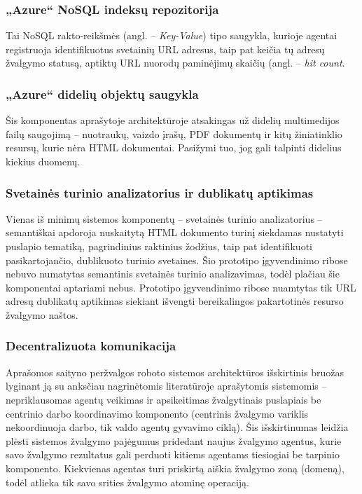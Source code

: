 \subsubsection{„Azure“ NoSQL indeksų repozitorija}

Tai NoSQL rakto-reikšmės (angl. -- \textit{Key-Value}) tipo saugykla, kurioje agentai registruoja identifikuotus svetainių URL adresus, taip pat keičia tų adresų žvalgymo statusą, aptiktų URL nuorodų paminėjimų skaičių (angl. -- \textit{hit count}.

\subsubsection{„Azure“ didelių objektų saugykla}

Šis komponentas aprašytoje architektūroje atsakingas už didelių multimedijos failų saugojimą -- nuotraukų, vaizdo įrašų, PDF dokumentų ir kitų žiniatinklio resursų, kurie nėra HTML dokumentai. Pasižymi tuo, jog gali talpinti didelius kiekius duomenų.

\subsubsection{Svetainės turinio analizatorius ir dublikatų aptikimas}

Vienas iš minimų sistemos komponentų -- svetainės turinio analizatorius -- semantiškai apdoroja nuskaitytą HTML dokumento turinį siekdamas nustatyti puslapio tematiką, pagrindinius raktinius žodžius, taip pat identifikuoti pasikartojančio, dublikuoto turinio svetaines. Šio prototipo įgyvendinimo ribose nebuvo numatytas semantinis svetainės turinio analizavimas, todėl plačiau šie komponentai aptariami nebus. Prototipo įgyvendinimo ribose nuamtytas tik URL adresų dublikatų aptikimas siekiant išvengti bereikalingos pakartotinės resurso žvalgymo naštos.

\subsubsection{Decentralizuota komunikacija}

Aprašomos saityno peržvalgos roboto sistemos architektūros išskirtinis bruožas lyginant ją su anksčiau nagrinėtomis literatūroje aprašytomis sistemomis -- nepriklausomas agentų veikimas ir apsikeitimas žvalgytinais puslapiais be centrinio darbo koordinavimo komponento \cite{MercedCloudBasedWebCrawler} (centrinis žvalgymo variklis nekoordinuoja darbo, tik valdo agentų gyvavimo ciklą). Šis išskirtinumas leidžia plėsti sistemos žvalgymo pajėgumus pridedant naujus žvalgymo agentus, kurie savo žvalgymo rezultatus gali perduoti kitiems agentams tiesiogiai be tarpinio komponento. Kiekvienas agentas turi priskirtą aiškia žvalgymo zoną (domeną), todėl atlieka tik savo srities žvalgymo atominę operaciją.

